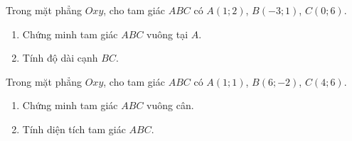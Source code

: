 \begin{bt}%
	Trong mặt phẳng $O x y$, cho tam giác $ABC$ có $A(1 ; 2)$, $B(-3 ; 1)$, $C(0 ; 6)$.
	\begin{enumerate}
			\item Chứng minh tam giác $A B C$ vuông tại $A$.
		\item Tính độ dài cạnh $BC$.
		\end{enumerate}
\end{bt}

\begin{bt}%
	Trong mặt phẳng $Oxy$, cho tam giác $ABC$ có $A(1;1)$, $B(6;-2)$, $C(4;6)$. 
\begin{enumerate}
		\item Chứng minh tam giác $ABC$ vuông cân.
		\item  Tính diện tích tam giác $ABC$.

\end{enumerate}
\end{bt}

